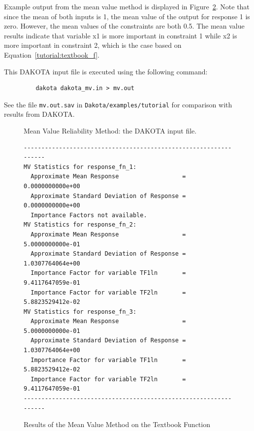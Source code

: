 Example output from the mean value method is displayed in 
Figure~\ref{tutorial:results_mv}. Note that since the mean of both inputs
is 1, the mean value of the output for response 1 is zero. 
However, the mean values of the constraints are both 0.5. 
The mean value results indicate that variable x1 is more 
important in constraint 1 while x2 is more important in constraint 2, 
which is the case based on Equation~\ref{tutorial:textbook_f}.

This DAKOTA input file is executed using the following command:
\begin{small}
\begin{verbatim}
         dakota dakota_mv.in > mv.out
\end{verbatim}
\end{small}
See the file \texttt{mv.out.sav} in \texttt{Dakota/examples/tutorial} 
for comparison with results from DAKOTA. 

\begin{figure}[ht!]
  \centering
  \begin{bigbox}
    \begin{small}
    \end{small}
  \end{bigbox}
  \caption{Mean Value Reliability Method: the DAKOTA input file.}
  \label{tutorial:textbook_mv}
\end{figure}

\begin{figure}
\centering
\begin{bigbox}
\begin{small}
\begin{verbatim}
-----------------------------------------------------------------
MV Statistics for response_fn_1:
  Approximate Mean Response                  =  0.0000000000e+00
  Approximate Standard Deviation of Response =  0.0000000000e+00
  Importance Factors not available.
MV Statistics for response_fn_2:
  Approximate Mean Response                  =  5.0000000000e-01
  Approximate Standard Deviation of Response =  1.0307764064e+00
  Importance Factor for variable TF1ln       =  9.4117647059e-01
  Importance Factor for variable TF2ln       =  5.8823529412e-02
MV Statistics for response_fn_3:
  Approximate Mean Response                  =  5.0000000000e-01
  Approximate Standard Deviation of Response =  1.0307764064e+00
  Importance Factor for variable TF1ln       =  5.8823529412e-02
  Importance Factor for variable TF2ln       =  9.4117647059e-01
-----------------------------------------------------------------
\end{verbatim}
\end{small}
\end{bigbox}
\caption{Results of the Mean Value Method on the Textbook Function}
\label{tutorial:results_mv}
\end{figure}



